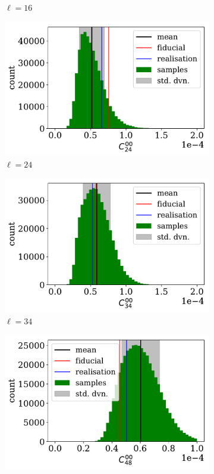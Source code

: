 \begin{figure}
\begin{subfigure}{.5\textwidth}
  \caption{$\ell = 16$}
\end{subfigure}
\begin{subfigure}{.5\textwidth}
  \centering
  \includegraphics[width=\textwidth]{BPL-FIGS/Euclid-LN-PNoi-N32-HDens_HISTOGRAM-ell-24.pdf}
  \caption{$\ell = 24$}
\end{subfigure}
\begin{subfigure}{.5\textwidth}
  \centering
  \includegraphics[width=\textwidth]{BPL-FIGS/Euclid-LN-PNoi-N32-HDens_HISTOGRAM-ell-34.pdf}
  \caption{$\ell = 34$}
\end{subfigure}
\begin{subfigure}{.5\textwidth}
  \centering
  \includegraphics[width=\textwidth]{BPL-FIGS/Euclid-LN-PNoi-N32-HDens_HISTOGRAM-ell-48.pdf}

\end{subfigure}
\end{figure}
